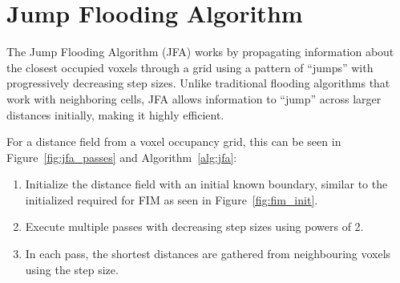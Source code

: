 \section{Jump Flooding Algorithm} \label{sec:jfa}
The Jump Flooding Algorithm (JFA) works by propagating information about the closest occupied voxels through a grid
using a pattern of ``jumps'' with progressively decreasing step sizes. Unlike traditional flooding algorithms that work
with neighboring cells, JFA allows information to ``jump'' across larger distances initially, making it highly efficient.

For a distance field from a voxel occupancy grid, this can be seen in Figure~\ref{fig:jfa_passes} and
Algorithm~\ref{alg:jfa}:
\begin{enumerate}
    \item Initialize the distance field with an initial known boundary, similar to the initialized required for FIM as
          seen in Figure~\ref{fig:fim_init}.
    \item Execute multiple passes with decreasing step sizes using powers of 2.
    \item In each pass, the shortest distances are gathered from neighbouring voxels using the step size.
\end{enumerate}

